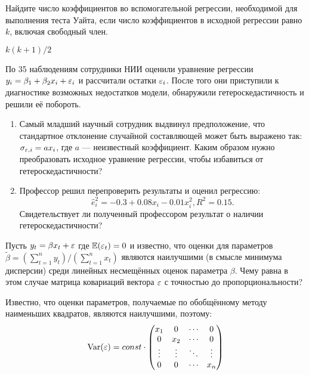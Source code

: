 \begin{problem}
Найдите число коэффициентов во вспомогательной регрессии, необходимой для выполнения теста Уайта, если число коэффициентов в исходной регрессии равно $k$, включая свободный член.


\begin{sol}
$k(k+1)/2$
\end{sol}
\end{problem}


\begin{problem}
По 35 наблюдениям сотрудники НИИ оценили уравнение регрессии $y_i = \beta_1 + \beta_2 x_i + \varepsilon_i$ и рассчитали остатки $\varepsilon_i$. После того они приступили к диагностике возможных недостатков модели, обнаружили гетероскедастичность и решили её побороть.
\begin{enumerate}
\item Самый младший научный сотрудник выдвинул предположение, что стандартное отклонение случайной составляющей может быть выражено так: $\sigma_{\varepsilon, i} = a x_i$, где $a$ — неизвестный коэффициент. Каким образом нужно преобразовать исходное уравнение регрессии, чтобы избавиться от гетероскедастичности?
\item Профессор решил перепроверить результаты и оценил регрессию:
\[
\hat{e}_i^2 = -0.3 + 0.08 x_i - 0.01 x_i^2, R^2 = 0.15.
\]
Свидетельствует ли полученный профессором результат о наличии гетероскедастичности?
\end{enumerate}


\begin{sol}
\end{sol}
\end{problem}



\begin{problem}
Пусть $y_t = \beta x_t + \varepsilon$ где $\mathbb{E}(\varepsilon_t) = 0$ и известно, что оценки для параметров $\tilde{\beta} = \left( \sum_{t=1}^n y_t \right)/\left( \sum_{t=1}^n x_t \right)$ являются наилучшими (в смысле минимума дисперсии) среди линейных несмещённых оценок параметра $\beta$. 
Чему равна в этом случае матрица ковариаций вектора $\varepsilon$ с точностью до пропорциональности?



\begin{sol}
Известно, что оценки параметров, получаемые по обобщённому методу наименьших квадратов, являются наилучшими, поэтому:
\[
\operatorname{Var}(\varepsilon) = const \cdot 
\begin{pmatrix}
x_1     & 0      & \cdots & 0 \\
0       & x_2    & \cdots & 0 \\
\vdots  & \vdots & \ddots & \vdots \\
0       & 0      & \cdots & x_n \\
\end{pmatrix}
\]
\end{sol}
\end{problem}



